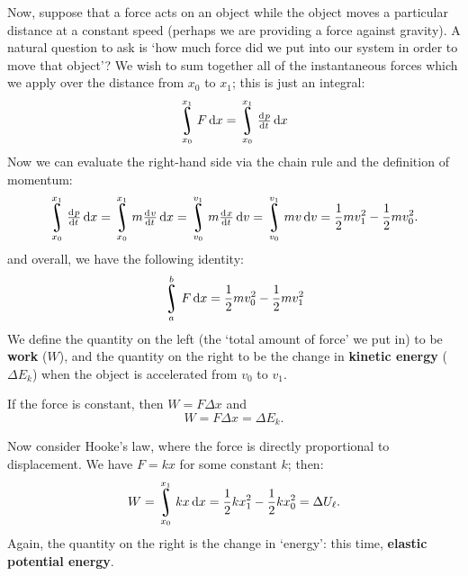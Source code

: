 \documentclass[a4paper]{amsbook}
\theoremstyle{definition}
\numberwithin{exercise}{chapter}
\numberwithin{exercise}{chapter}
\DeclareMathOperator*{\rint}{\scalerel*{\rotatebox{17}{$\!\int\!$}}{\int}}
\begin{document}
Now, suppose that a force acts on an object while the object moves a particular distance at a constant speed (perhaps we are
providing a force against gravity). A natural question to ask is `how much force did we put into our system in order to move
that object'? We wish to sum together all of the instantaneous forces which we apply over the distance from $ x_0 $ to $ x_1 $;
this is just an integral:
\begin{displaymath}
  \rint_{x_0}^{x_1} F \dif{x} = \rint_{x_0}^{x_1} \od{p}{t} \dif{x}
\end{displaymath}
Now we can evaluate the right-hand side via the chain rule and the definition of momentum:
\begin{displaymath}
  \rint_{x_0}^{x_1} \od{p}{t} \dif{x} = \rint_{x_0}^{x_1} m \od{v}{t} \dif{x} = \rint_{v_0}^{v_1} m \od{x}{t} \dif{v}
    = \rint_{v_0}^{v_1} mv \dif{v} = \frac{1}{2}mv_1^2 - \frac{1}{2}mv_0^2.
\end{displaymath}
and overall, we have the following identity:
\begin{displaymath}
  \rint_a^b F \dif{x} = \frac{1}{2}mv_0^2 - \frac{1}{2}mv_1^2
\end{displaymath}
We define the quantity on the left (the `total amount of force' we put in) to be \textbf{work} ($ W $), and the quantity on
the right to be the change in \textbf{kinetic energy} ($ \Delta E_k $) when the object is accelerated from $ v_0 $ to $ v_1 $.

If the force is constant, then $ W = F\Delta x $ and
\begin{equation}
  W = F \Delta x = \Delta E_k.
\end{equation}

Now consider Hooke's law, where the force is directly proportional to displacement. We have $ F = kx $ for some constant $ k $; then:
\begin{equation}
  W = \rint_{x_0}^{x_1} kx \dif{x} = \frac{1}{2}kx_1^2 - \frac{1}{2}kx_0^2 = \Delta U_\ell.
\end{equation}
Again, the quantity on the right is the change in `energy': this time, \textbf{elastic potential energy}.
\end{document}
